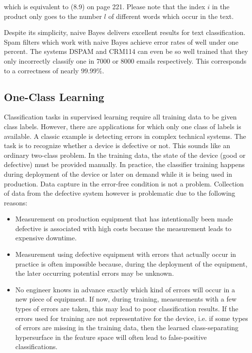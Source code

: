 \documentclass[10pt]{book}
\begin{document}
which is equivalent to (8.9) on page 221. Please note that the index $i$ in the product only goes to the number $l$ of different words which occur in the text.

Despite its simplicity, naive Bayes delivers excellent results for text classification. Spam filters which work with naive Bayes achieve error rates of well under one percent. The systems DSPAM and CRM114 can even be so well trained that they only incorrectly classify one in 7000 or 8000 emails respectively. This corresponds to a correctness of nearly $99.99 \%$.

\subsection*{One-Class Learning}
Classification tasks in supervised learning require all training data to be given class labels. However, there are applications for which only one class of labels is available. A classic example is detecting errors in complex technical systems. The task is to recognize whether a device is defective or not. This sounds like an ordinary two-class problem. In the training data, the state of the device (good or defective) must be provided manually. In practice, the classifier training happens during deployment of the device or later on demand while it is being used in production. Data capture in the error-free condition is not a problem. Collection of data from the defective system however is problematic due to the following reasons:

\begin{itemize}
  \item Measurement on production equipment that has intentionally been made defective is associated with high costs because the measurement leads to expensive downtime.
  \item Measurement using defective equipment with errors that actually occur in practice is often impossible because, during the deployment of the equipment, the later occurring potential errors may be unknown.
  \item No engineer knows in advance exactly which kind of errors will occur in a new piece of equipment. If now, during training, measurements with a few types of errors are taken, this may lead to poor classification results. If the errors used for training are not representative for the device, i.e. if some types of errors are missing in the training data, then the learned class-separating hypersurface in the feature space will often lead to false-positive classifications.
\end{itemize}
\end{document}
